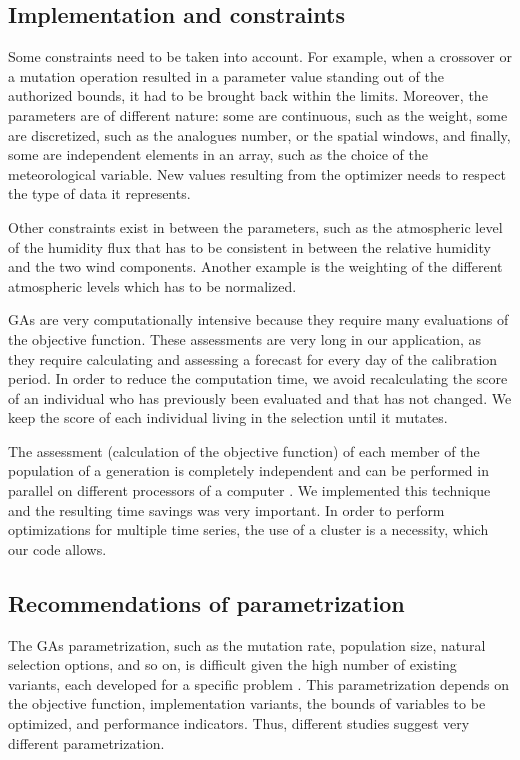 \documentclass[twocol]{ametsoc}
\begin{document}
\subsection{Implementation and constraints}

Some constraints need to be taken into account. For example, when a crossover or a mutation operation resulted in a parameter value standing out of the authorized bounds, it had to be brought back within the limits. Moreover, the parameters are of different nature: some are continuous, such as the weight, some are discretized, such as the analogues number, or the spatial windows, and finally, some are independent elements in an array, such as the choice of the meteorological variable. New values resulting from the optimizer needs to respect the type of data it represents.

Other constraints exist in between the parameters, such as the atmospheric level of the humidity flux that has to be consistent in between the relative humidity and the two wind components. Another example is the weighting of the different atmospheric levels which has to be normalized.

GAs are very computationally intensive because they require many evaluations of the objective function. These assessments are very long in our application, as they require calculating and assessing a forecast for every day of the calibration period. In order to reduce the computation time, we avoid recalculating the score of an individual who has previously been evaluated and that has not changed. We keep the score of each individual living in the selection until it mutates.

The assessment (calculation of the objective function) of each member of the population of a generation is completely independent and can be performed in parallel on different processors of a computer \citep{Haupt2004, Alliot2005}. We implemented this technique and the resulting time savings was very important. In order to perform optimizations for multiple time series, the use of a cluster is a necessity, which our code allows.


\subsection{Recommendations of parametrization}

The GAs parametrization, such as the mutation rate, population size, natural selection options, and so on, is difficult given the high number of existing variants, each developed for a specific problem \citep{Haupt2004, Costa2007a}. This parametrization depends on the objective function, implementation variants, the bounds of variables to be optimized, and performance indicators. Thus, different studies suggest very different parametrization.
\end{document}
